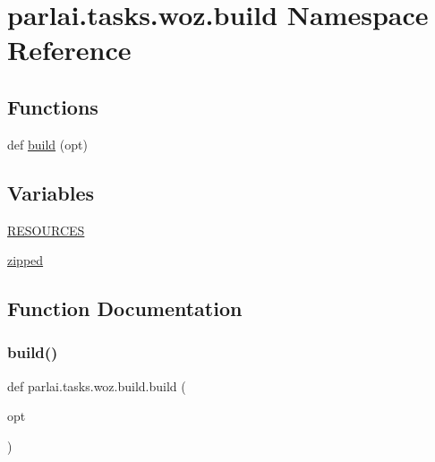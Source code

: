 \hypertarget{namespaceparlai_1_1tasks_1_1woz_1_1build}{}\section{parlai.\+tasks.\+woz.\+build Namespace Reference}
\label{namespaceparlai_1_1tasks_1_1woz_1_1build}
\subsection*{Functions}
\begin{DoxyCompactItemize}
\item 
def \hyperlink{namespaceparlai_1_1tasks_1_1woz_1_1build_ab38bcd37eac166f65dd77a51c0d8e934}{build} (opt)
\end{DoxyCompactItemize}
\subsection*{Variables}
\begin{DoxyCompactItemize}
\item 
\hyperlink{namespaceparlai_1_1tasks_1_1woz_1_1build_a5cef39ffd42686f4cc8c6a5e5fa120e2}{R\+E\+S\+O\+U\+R\+C\+ES}
\item 
\hyperlink{namespaceparlai_1_1tasks_1_1woz_1_1build_aba5672ed5fa36cb7f66f392d23fb9f0e}{zipped}
\end{DoxyCompactItemize}


\subsection{Function Documentation}
\mbox{\label{namespaceparlai_1_1tasks_1_1woz_1_1build_ab38bcd37eac166f65dd77a51c0d8e934}} 
\subsubsection{\texorpdfstring{build()}{build()}}
{\footnotesize\ttfamily def parlai.\+tasks.\+woz.\+build.\+build (\begin{DoxyParamCaption}\item[{}]{opt }\end{DoxyParamCaption})}




